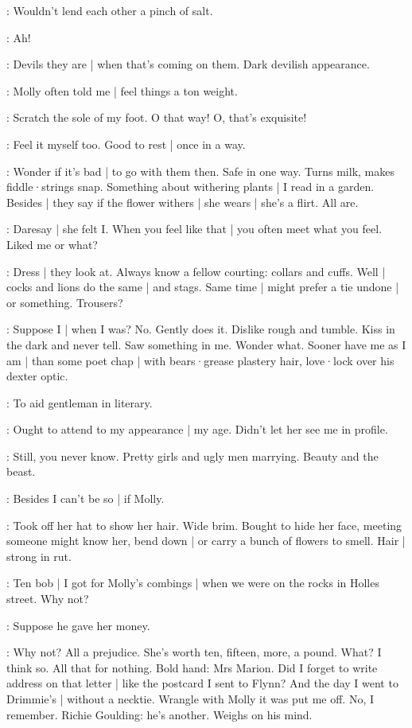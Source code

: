 \BloomAbstract:
Wouldn't lend each other
a pinch of salt.

\BloomInt:
Ah!

\BloomAbstract:
Devils they are |
when that's coming on them.
Dark devilish appearance.

\BloomHist:
Molly often told me |
feel things a ton weight.

\BloomOther:
Scratch the sole of my foot.
O that way!
O,
that's exquisite!

\BloomHist:
Feel it myself too.
Good to rest |
once in a way.

\BloomAbstract:
Wonder if it's bad |
to go with them then.
Safe in one way.
Turns milk,
makes fiddle·strings snap.
Something about withering plants |
I read in a garden.
Besides |
they say if the flower withers |
she wears |
she's a flirt.
All are.

\BloomCurrent:
Daresay |
she felt I.
When you feel like that |
you often meet what you feel.
Liked me or what?

\BloomAbstract:
Dress |
they look at.
Always know a fellow courting:
collars and cuffs.%
Well |
cocks and lions do the same |
and stags.
Same time |
might prefer a tie undone |
or something.
Trousers?

\BloomCurrent:
Suppose I |
when I was?
No.
Gently does it.
Dislike rough and tumble.
Kiss in the dark
and never tell.
Saw something in me.
Wonder what.
Sooner have me
as I am |
than some poet chap |
with bears·grease plastery hair,
love·lock over his dexter optic.

\BloomAbstract:
To aid gentleman in literary.

\BloomCurrent:
Ought to attend to my appearance |
my age.
Didn't let her see me in profile.

\BloomAbstract:
Still,
you never know.
Pretty girls and ugly men marrying.
Beauty and the beast.

\BloomHist:
Besides I can't be so |
if Molly.

\BloomCurrent:
Took off her hat to show her hair.
Wide brim.
Bought to hide her face,
meeting someone might know her,
bend down |
or carry a bunch of flowers to smell.
Hair |
strong in rut.

\BloomHist:
Ten bob |
I got for Molly's combings |
when we were on the rocks
in Holles street.
Why not?

\BloomToday:
Suppose he gave her money.

\BloomHist:
Why not?
All a prejudice.
She's worth ten,
fifteen,
more,
a pound.
What?
I think so.
All that for nothing.
Bold hand:
Mrs Marion.
Did I forget
to write address on that letter |
like the postcard I sent to Flynn?
And the day I went to Drimmie's |
without a necktie.
Wrangle with Molly
it was put me off.
No,
I remember.
Richie Goulding:
he's another.
Weighs on his mind.

